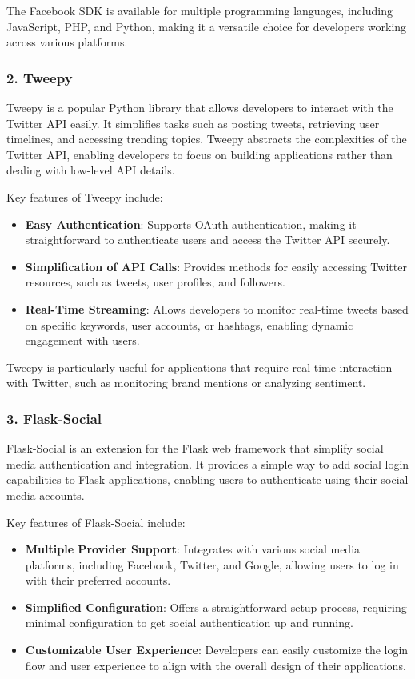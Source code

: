 The Facebook SDK is available for multiple programming languages, including JavaScript, PHP, and Python, making it a versatile choice for developers working across various platforms.

\subsubsection{2. Tweepy}

Tweepy is a popular Python library that allows developers to interact with the Twitter API easily. It simplifies tasks such as posting tweets, retrieving user timelines, and accessing trending topics. Tweepy abstracts the complexities of the Twitter API, enabling developers to focus on building applications rather than dealing with low-level API details.

Key features of Tweepy include:
\begin{itemize}
    \item \textbf{Easy Authentication}: Supports OAuth authentication, making it straightforward to authenticate users and access the Twitter API securely.
    \item \textbf{Simplification of API Calls}: Provides methods for easily accessing Twitter resources, such as tweets, user profiles, and followers.
    \item \textbf{Real-Time Streaming}: Allows developers to monitor real-time tweets based on specific keywords, user accounts, or hashtags, enabling dynamic engagement with users.
\end{itemize}

Tweepy is particularly useful for applications that require real-time interaction with Twitter, such as monitoring brand mentions or analyzing sentiment.

\subsubsection{3. Flask-Social}

Flask-Social is an extension for the Flask web framework that simplify social media authentication and integration. It provides a simple way to add social login capabilities to Flask applications, enabling users to authenticate using their social media accounts.

Key features of Flask-Social include:
\begin{itemize}
    \item \textbf{Multiple Provider Support}: Integrates with various social media platforms, including Facebook, Twitter, and Google, allowing users to log in with their preferred accounts.
    \item \textbf{Simplified Configuration}: Offers a straightforward setup process, requiring minimal configuration to get social authentication up and running.
    \item \textbf{Customizable User Experience}: Developers can easily customize the login flow and user experience to align with the overall design of their applications.
\end{itemize}

